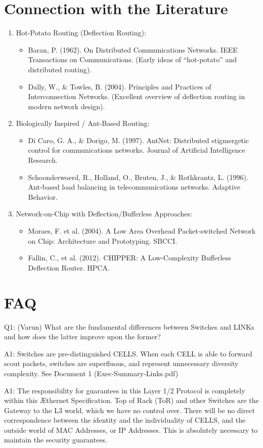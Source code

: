\documentclass[../HFT-main.tex]{subfiles} %
\begin{document}
\section{Connection with the Literature}  
\begin{enumerate}
\item  Hot-Potato Routing (Deflection Routing):
	\begin{itemize}
	\item Baran, P. (1962). On Distributed Communications Networks. IEEE Transactions on Communications. (Early ideas of “hot-potato” and distributed routing).
	\item Dally, W., \& Towles, B. (2004). Principles and Practices of Interconnection Networks. (Excellent overview of deflection routing in modern network design).
 	\end{itemize}

\item  Biologically Inspired / Ant-Based Routing:
	\begin{itemize}
	\item Di Caro, G. A., \& Dorigo, M. (1997). AntNet: Distributed stigmergetic control for communications networks. Journal of Artificial Intelligence Research.
	\item Schoonderwoerd, R., Holland, O., Bruten, J., \& Rothkrantz, L. (1996). Ant-based load balancing in telecommunications networks. Adaptive Behavior.
	\end{itemize}
\item	Network-on-Chip with Deflection/Bufferless Approaches:
	\begin{itemize}
	\item Moraes, F. et al. (2004). A Low Area Overhead Packet-switched Network on Chip: Architecture and Prototyping. SBCCI.
	\item Fallin, C., et al. (2012). CHIPPER: A Low-Complexity Bufferless Deflection Router. HPCA.
	\end{itemize}
\end{enumerate}


\section{FAQ}

Q1: (Varun)  What are the fundamental differences between Switches and LINKs and how does the latter improve upon the former?

A1: Switches are pre-distinguished CELLS.   When each CELL is able to forward scout packets, switches are superfluous, and represent unnecessary diversity complexity.  See Document 1 (Exec-Summary-Links.pdf)


A1: The responsibility for guarantees in this Layer 1/2 Protocol is completely within this Æthernet Specification.   Top of Rack (ToR) and other Switches are the Gateway to the L3 world, which we have no control over.  There will be no direct correspondence between the identity and the individuality of CELLS, and the outside world of MAC Addresses, or IP Addresses. This is absolutely necessary to maintain the security guarantees.
\end{document}
